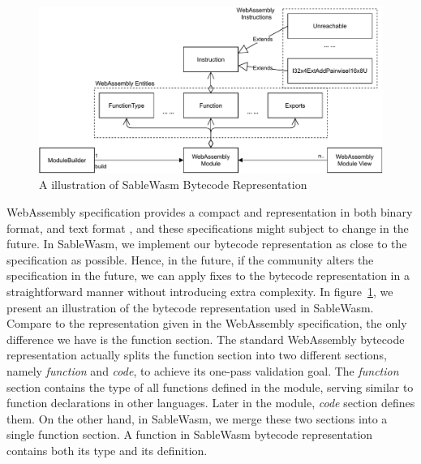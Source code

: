 \begin{figure}
  \centering
  \includegraphics[width=\textwidth]{Images/sablewasm-bytecode.pdf}
  \caption{A illustration of SableWasm Bytecode Representation}
  \label{fig:sablewasm-bytecode}
\end{figure}

WebAssembly specification provides a compact and representation in both binary format, and text format \cite{10.1145/3062341.3062363}, and these specifications might subject to change in the future. In SableWasm, we implement our bytecode representation as close to the specification as possible.  Hence, in the future, if the community alters the specification in the future, we can apply fixes to the bytecode representation in a straightforward manner without introducing extra complexity. In figure~\ref{fig:sablewasm-bytecode}, we present an illustration of the bytecode representation used in SableWasm. Compare to the representation given in the WebAssembly specification, the only difference we have is the function section. The standard WebAssembly bytecode representation actually splits the function section into two different sections, namely \emph{function} and \emph{code}, to achieve its one-pass validation goal. The \emph{function} section contains the type of all functions defined in the module, serving similar to function declarations in other languages. Later in the module, \emph{code} section defines them. On the other hand, in SableWasm, we merge these two sections into a single function section. A function in SableWasm bytecode representation contains both its type and its definition.

